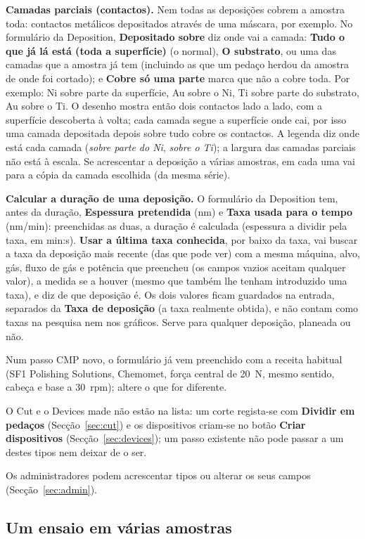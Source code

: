\documentclass[11pt,a4paper]{article}
\newcommand{\ui}[1]{\textsf{\textbf{#1}}}
\begin{document}
\textbf{Camadas parciais (contactos).} Nem todas as deposições cobrem a amostra
toda: contactos metálicos depositados através de uma máscara, por exemplo. No
formulário da Deposition, \ui{Depositado sobre} diz onde vai a camada:
\ui{Tudo o que já lá está (toda a superfície)} (o normal), \ui{O substrato},
ou uma das camadas que a amostra já tem (incluindo as que um pedaço herdou
da amostra de onde foi cortado); e \ui{Cobre só uma parte} marca que
não a cobre toda. Por exemplo: Ni sobre parte da superfície, Au sobre o Ni,
Ti sobre parte do substrato, Au sobre o Ti. O desenho mostra então dois
contactos lado a lado, com a superfície descoberta à volta; cada camada segue
a superfície onde cai, por isso uma camada depositada depois sobre tudo cobre
os contactos. A legenda diz onde está cada camada (\emph{sobre parte do Ni},
\emph{sobre o Ti}); a largura das camadas parciais não está à escala. Se
acrescentar a deposição a várias amostras, em cada uma vai para a cópia da
camada escolhida (da mesma série).

\textbf{Calcular a duração de uma deposição.} O formulário da Deposition tem,
antes da duração, \ui{Espessura pretendida} (nm) e \ui{Taxa usada para o
tempo} (nm/min): preenchidas as duas, a duração é calculada (espessura a
dividir pela taxa, em min:s). \ui{Usar a última taxa conhecida}, por baixo da
taxa, vai buscar a taxa da deposição mais recente (das que pode ver) com a
mesma máquina, alvo, gás, fluxo de gás e potência que preencheu (os campos
vazios aceitam qualquer valor), a medida se a houver (mesmo que também lhe
tenham introduzido uma taxa), e diz de que deposição é. Os dois valores ficam guardados na entrada, separados da \ui{Taxa de
deposição} (a taxa realmente obtida), e não contam como taxas na pesquisa nem
nos gráficos. Serve para qualquer deposição, planeada ou não.

Num passo CMP novo, o formulário já vem preenchido com a receita habitual
(SF1 Polishing Solutions, Chemomet, força central de 20~N, mesmo sentido,
cabeça e base a 30~rpm); altere o que for diferente.

O Cut e o Devices made não estão na lista: um corte regista-se com
\ui{Dividir em pedaços} (Secção~\ref{sec:cut}) e os dispositivos criam-se no
botão \ui{Criar dispositivos} (Secção~\ref{sec:devices}); um passo existente não
pode passar a um destes tipos nem deixar de o ser.

Os administradores podem acrescentar tipos ou alterar os seus campos
(Secção~\ref{sec:admin}).

\subsection{Um ensaio em várias amostras}
\label{sec:runs}
\end{document}

